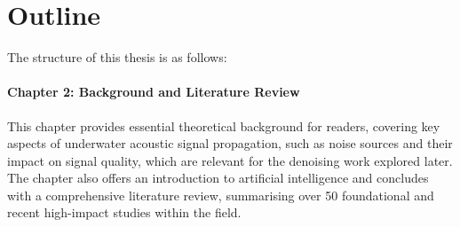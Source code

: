 



\section{Outline}

The structure of this thesis is as follows:

\paragraph{Chapter 2: Background and Literature Review} This chapter provides essential theoretical background for readers, covering key aspects of underwater acoustic signal propagation, such as noise sources and their impact on signal quality, which are relevant for the denoising work explored later. The chapter also offers an introduction to artificial intelligence and concludes with a comprehensive literature review, summarising over 50 foundational and recent high-impact studies within the field.


